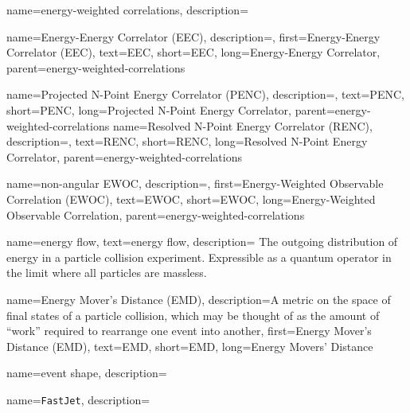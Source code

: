 {
    name=energy-weighted correlations,
    description={}
}


    {
        name=Energy-Energy Correlator (EEC),
        description={},
        first={Energy-Energy Correlator (EEC)},
        text={EEC},
        short={EEC},
        long={Energy-Energy Correlator},
        parent=energy-weighted-correlations
    }


    {
        name=Projected N-Point Energy Correlator (PENC),
        description={},
        text={PENC},
        short={PENC},
        long={Projected N-Point Energy Correlator},
        parent=energy-weighted-correlations
    }
    {
        name=Resolved N-Point Energy Correlator (RENC),
        description={},
        text={RENC},
        short={RENC},
        long={Resolved N-Point Energy Correlator},
        parent=energy-weighted-correlations
    }

    {
        name=non-angular EWOC,
        description={},
        first={Energy-Weighted Observable Correlation (EWOC)},
        text={EWOC},
        short={EWOC},
        long={Energy-Weighted Observable Correlation},
        parent=energy-weighted-correlations
    }


{
  name=energy flow,
  text=energy flow,
  description={
      The outgoing distribution of energy in a particle collision experiment.
      Expressible as a quantum operator in the limit where all particles are massless.
  }
}


{
    name=Energy Mover's Distance (EMD),
    description={A metric on the space of final states of a particle collision, which may be thought of as the amount of ``work'' required to rearrange one event into another},
    first={Energy Mover's Distance (EMD)},
    text={EMD},
    short={EMD},
    long={Energy Movers' Distance}
}


{
  name=event shape,
  description={}
}



{
    name=\texttt{FastJet},
    description={}
}


